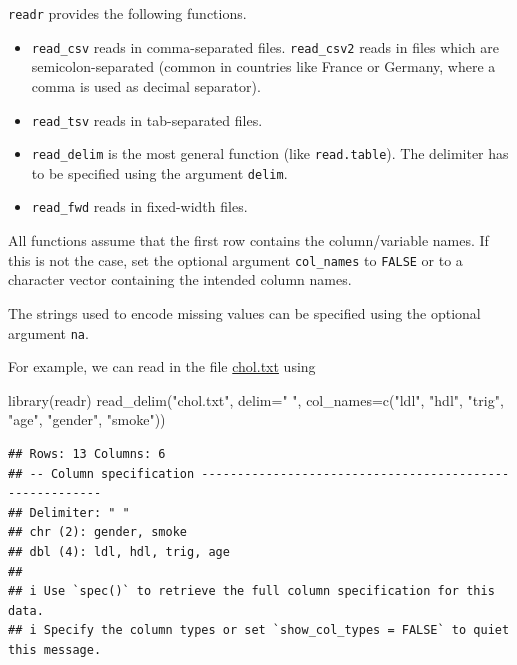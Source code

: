 \documentclass[
]{book}
\newenvironment{Shaded}{\begin{snugshade}}{\end{snugshade}}
\newcommand{\AttributeTok}[1]{\textcolor[rgb]{0.77,0.63,0.00}{#1}}
\newcommand{\FunctionTok}[1]{\textcolor[rgb]{0.00,0.00,0.00}{#1}}
\newcommand{\NormalTok}[1]{#1}
\newcommand{\StringTok}[1]{\textcolor[rgb]{0.31,0.60,0.02}{#1}}
\providecommand{\tightlist}{%
  \setlength{\itemsep}{0pt}\setlength{\parskip}{0pt}}
\begin{document}
\texttt{readr} provides the following functions.

\begin{itemize}
\tightlist
\item
  \texttt{read\_csv} reads in comma-separated files. \texttt{read\_csv2} reads in files which are semicolon-separated (common in countries like France or Germany, where a comma is used as decimal separator).
\item
  \texttt{read\_tsv} reads in tab-separated files.
\item
  \texttt{read\_delim} is the most general function (like \texttt{read.table}). The delimiter has to be specified using the argument \texttt{delim}.
\item
  \texttt{read\_fwd} reads in fixed-width files.
\end{itemize}

All functions assume that the first row contains the column/variable names. If this is not the case, set the optional argument \texttt{col\_names} to \texttt{FALSE} or to a character vector containing the intended column names.

The strings used to encode missing values can be specified using the optional argument \texttt{na}.

For example, we can read in the file \href{https://raw.githubusercontent.com/UofGAnalyticsData/R/main/Week\%203/chol.txt}{chol.txt} using

\begin{Shaded}
\begin{Highlighting}[]
\FunctionTok{library}\NormalTok{(readr)}
\FunctionTok{read\_delim}\NormalTok{(}\StringTok{"chol.txt"}\NormalTok{, }\AttributeTok{delim=}\StringTok{" "}\NormalTok{, }\AttributeTok{col\_names=}\FunctionTok{c}\NormalTok{(}\StringTok{"ldl"}\NormalTok{, }\StringTok{"hdl"}\NormalTok{, }\StringTok{"trig"}\NormalTok{,}
                                              \StringTok{"age"}\NormalTok{, }\StringTok{"gender"}\NormalTok{, }\StringTok{"smoke"}\NormalTok{))}
\end{Highlighting}
\end{Shaded}

\begin{verbatim}
## Rows: 13 Columns: 6
## -- Column specification --------------------------------------------------------
## Delimiter: " "
## chr (2): gender, smoke
## dbl (4): ldl, hdl, trig, age
## 
## i Use `spec()` to retrieve the full column specification for this data.
## i Specify the column types or set `show_col_types = FALSE` to quiet this message.
\end{verbatim}
\end{document}

